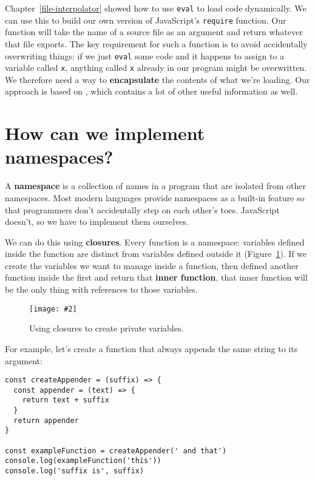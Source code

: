 \documentclass[krantzl]{krantz}
\newcommand{\figpdf}[4]{\begin{figure}%
\centering%
\texttt{[image: \#2]}%
\caption{#3}%
\label{#1}%
\end{figure}}
\newcommand{\chapref}[1]{Chapter~\ref{#1}}
\newcommand{\figref}[1]{Figure~\ref{#1}}
\newcommand{\glossref}[1]{\textbf{#1}}
\begin{document}
\chapref{file-interpolator} showed how to use \texttt{eval} to load code dynamically.
We can use this to build our own version of JavaScript's \texttt{require} function.
Our function will take the name of a source file as an argument
and return whatever that file exports.
The key requirement for such a function is to avoid accidentally overwriting things:
if we just \texttt{eval} some code and it happens to assign to a variable called \texttt{x},
anything called \texttt{x} already in our program might be overwritten.
We therefore need a way to \glossref{encapsulate} the contents of what we're loading.
Our approach is based on \cite{Casciaro2020},
which contains a lot of other useful information as well.

\section{How can we implement namespaces?}\label{module-loader-namespace}


A \glossref{namespace} is a collection of names in a program
that are isolated from other namespaces.
Most modern languages provide namespaces as a built-in feature
so that programmers don't accidentally step on each other's toes.
JavaScript doesn't,
so we have to implement them ourselves.


We can do this using \glossref{closures}.
Every function is a namespace:
variables defined inside the function are distinct from variables defined outside it
(\figref{module-loader-closures}).
If we create the variables we want to manage inside a function,
then defined another function inside the first
and return that \glossref{inner function},
that inner function will be the only thing with references to those variables.

\figpdf{module-loader-closures}{./module-loader/closures.pdf}{Using closures to create private variables.}{0.6}


For example,
let's create a function that always appends the same string to its argument:


\begin{lstlisting}[frame=single,frameround=tttt]
const createAppender = (suffix) => {
  const appender = (text) => {
    return text + suffix
  }
  return appender
}

const exampleFunction = createAppender(' and that')
console.log(exampleFunction('this'))
console.log('suffix is', suffix)
\end{lstlisting}
\end{document}
